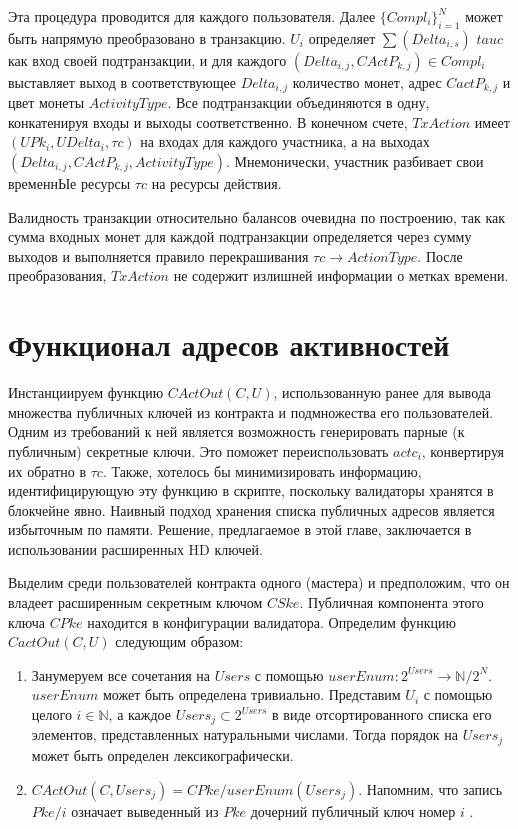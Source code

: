 \documentclass[specification,annotation]{itmo-student-thesis}
\begin{document}
Эта процедура проводится для каждого пользователя. Далее
$\{Compl_i\}_{i=1}^N$ может быть напрямую преобразовано в
транзакцию. $U_i$ определяет $\sum(Delta_{i,s})$ $tauc$ как вход своей
подтранзакции, и для каждого $(Delta_{i,j}, CActP_{k,j}) \in Compl_i$
выставляет выход в соответствующее $Delta_{i,j}$ количество монет,
адрес $CactP_{k,j}$ и цвет монеты $ActivityType$. Все подтранзакции
объединяются в одну, конкатенируя входы и выходы соответственно. В
конечном счете, $TxAction$ имеет $(UPk_i, UDelta_i, \tau c)$ на входах
для каждого участника, а на выходах $(Delta_{i,j}, CActP_{k,j},
ActivityType)$. Мнемонически, участник разбивает свои временнЫе
ресурсы $\tau c$ на ресурсы действия.

Валидность транзакции относительно балансов очевидна по построению,
так как сумма входных монет для каждой подтранзакции определяется
через сумму выходов и выполняется правило перекрашивания $\tau c
\rightarrow ActionType$. После преобразования, $TxAction$ не содержит
излишней информации о метках времени.

\section{Функционал адресов активностей}

Инстанциируем функцию $CActOut(C, U)$, использованную ранее для вывода
множества публичных ключей из контракта и подмножества его
пользователей. Одним из требований к ней является возможность
генерировать парные (к публичным) секретные ключи. Это поможет
переиспользовать $actc_i$, конвертируя их обратно в $\tau c$. Также,
хотелось бы минимизировать информацию, идентифицирующую эту функцию в
скрипте, поскольку валидаторы хранятся в блокчейне явно. Наивный
подход хранения списка публичных адресов является избыточным по
памяти. Решение, предлагаемое в этой главе, заключается в
использовании расширенных HD ключей.

Выделим среди пользователей контракта одного (мастера) и предположим,
что он владеет расширенным секретным ключом $CSke$. Публичная
компонента этого ключа $CPke$ находится в конфигурации
валидатора. Определим функцию $CactOut(C,U)$ следующим образом:

\begin{enumerate}
\item Занумеруем все сочетания на $Users$ с помощью $userEnum :
  2^{Users} \rightarrow \mathbb{N} / 2^N$. $userEnum$ может быть
  определена тривиально. Представим $U_i$ с помощью целого $i \in
  \mathbb{N}$, а каждое $Users_j \subset 2^{Users}$ в виде
  отсортированного списка его элементов, представленных натуральными
  числами. Тогда порядок на $Users_j$ может быть определен
  лексикографически.
\item $CActOut(C,Users_j) = CPke/userEnum(Users_j)$. Напомним, что
  запись $Pke/i$ означает выведенный из $Pke$ дочерний публичный ключ
  номер $i$ .
\end{enumerate}
\end{document}
